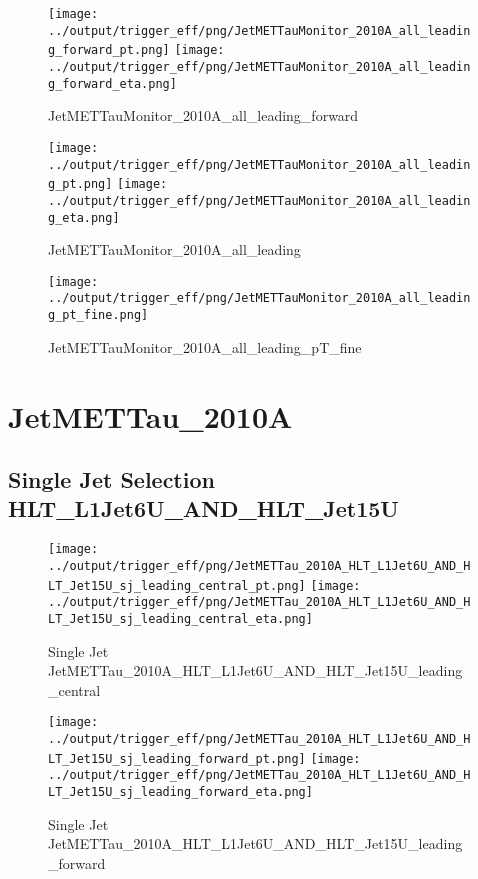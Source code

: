 \documentclass[11pt]{article}
\begin{document}
\begin{figure}[ht]
\centering
\texttt{[image: ../output/trigger\_eff/png/JetMETTauMonitor\_2010A\_all\_leading\_forward\_pt.png]}
\texttt{[image: ../output/trigger\_eff/png/JetMETTauMonitor\_2010A\_all\_leading\_forward\_eta.png]}
\caption{JetMETTauMonitor\_2010A\_all\_leading\_forward}
\label{fig:jetmettaumon_all_leading_forward}
\end{figure}

\begin{figure}[ht]
\centering
\texttt{[image: ../output/trigger\_eff/png/JetMETTauMonitor\_2010A\_all\_leading\_pt.png]}
\texttt{[image: ../output/trigger\_eff/png/JetMETTauMonitor\_2010A\_all\_leading\_eta.png]}
\caption{JetMETTauMonitor\_2010A\_all\_leading}
\label{fig:jetmettaumon_all_leading}
\end{figure}

\begin{figure}[ht]
\centering
\texttt{[image: ../output/trigger\_eff/png/JetMETTauMonitor\_2010A\_all\_leading\_pt\_fine.png]}
\caption{JetMETTauMonitor\_2010A\_all\_leading\_pT\_fine}
\label{fig:jetmettaumon_all_leading_pT_fine}
\end{figure}
\clearpage


\newpage
\section{JetMETTau\_2010A}

\subsection{Single Jet Selection HLT\_L1Jet6U\_AND\_HLT\_Jet15U}
\begin{figure}[ht]
\centering
\texttt{[image: ../output/trigger\_eff/png/JetMETTau\_2010A\_HLT\_L1Jet6U\_AND\_HLT\_Jet15U\_sj\_leading\_central\_pt.png]}
\texttt{[image: ../output/trigger\_eff/png/JetMETTau\_2010A\_HLT\_L1Jet6U\_AND\_HLT\_Jet15U\_sj\_leading\_central\_eta.png]}
\caption{Single Jet JetMETTau\_2010A\_HLT\_L1Jet6U\_AND\_HLT\_Jet15U\_leading\_central}
\label{fig:jetmettau_sj_HLT_L1Jet6U_AND_HLT_Jet15U_leading_central}
\end{figure}

\begin{figure}[ht]
\centering
\texttt{[image: ../output/trigger\_eff/png/JetMETTau\_2010A\_HLT\_L1Jet6U\_AND\_HLT\_Jet15U\_sj\_leading\_forward\_pt.png]}
\texttt{[image: ../output/trigger\_eff/png/JetMETTau\_2010A\_HLT\_L1Jet6U\_AND\_HLT\_Jet15U\_sj\_leading\_forward\_eta.png]}
\caption{Single Jet JetMETTau\_2010A\_HLT\_L1Jet6U\_AND\_HLT\_Jet15U\_leading\_forward}
\label{fig:jetmettau_sj_HLT_L1Jet6U_AND_HLT_Jet15U_leading_forward}
\end{figure}
\end{document}
